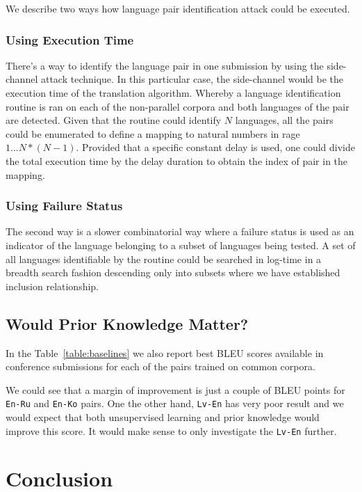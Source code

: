 \documentclass[]{article}
\begin{document}
We describe two ways how language pair identification attack could be executed.

\subsubsection{Using Execution Time}

There's a way to identify the language pair in one submission by using the side-channel attack technique.
In this particular case, the side-channel would be the execution time of the translation algorithm.
Whereby a language identification routine is ran on each of the non-parallel corpora and both languages of the pair are detected.
Given that the routine could identify $N$ languages, all the pairs could be enumerated to define a mapping to natural numbers in rage $1\dots N*(N-1)$.
Provided that a specific constant delay is used, one could divide the total execution time by the delay duration to obtain the index of pair in the mapping.

\subsubsection{Using Failure Status}

The second way is a slower combinatorial way where a failure status is used as an indicator of the language belonging to a subset of languages being tested.
A set of all languages identifiable by the routine could be searched in log-time in a breadth search fashion descending only into subsets where we have established inclusion relationship.

\subsection{Would Prior Knowledge Matter?}
\label{sect:prior}

In the Table~\ref{table:baselines} we also report best BLEU scores available in conference submissions for each of the pairs trained on common corpora.

We could see that a margin of improvement is just a couple of BLEU points for {\tt En-Ru} and {\tt En-Ko} pairs.
One the other hand, {\tt Lv-En} has very poor result and we would expect that both unsupervised learning and prior knowledge would improve this score.
It would make sense to only investigate the {\tt Lv-En} further.

\section{Conclusion}
\end{document}
